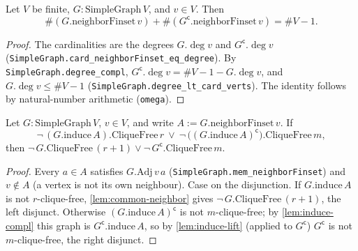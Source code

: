 \begin{lemma}
    \label{lem:degree-split}
    \leanok
    Let $V$ be finite, $G : \mathrm{SimpleGraph}\, V$, and $v \in V$. Then
    \[
        \#(G.\mathrm{neighborFinset}\, v) + \#(G^{\mathsf c}.\mathrm{neighborFinset}\, v)
        = \#V - 1 .
    \]
\end{lemma}
\begin{proof}
    The cardinalities are the degrees $G.\deg v$ and $G^{\mathsf c}.\deg v$
    (\texttt{SimpleGraph.card\_neighborFinset\_eq\_degree}). By
    \texttt{SimpleGraph.degree\_compl}, $G^{\mathsf c}.\deg v = \#V - 1 - G.\deg v$,
    and $G.\deg v \le \#V - 1$ (\texttt{SimpleGraph.degree\_lt\_card\_verts}).
    The identity follows by natural-number arithmetic (\texttt{omega}).
\end{proof}

\begin{lemma}
    \label{lem:neighbor-side}
    \leanok
    Let $G : \mathrm{SimpleGraph}\, V$, $v \in V$, and write
    $A := G.\mathrm{neighborFinset}\, v$. If
    \[
        \neg\,(G.\mathrm{induce}\, A).\mathrm{CliqueFree}\, r \ \lor\
        \neg\,\bigl((G.\mathrm{induce}\, A)^{\mathsf c}\bigr).\mathrm{CliqueFree}\, m ,
    \]
    then
    $\neg\, G.\mathrm{CliqueFree}\,(r{+}1) \lor \neg\, G^{\mathsf c}.\mathrm{CliqueFree}\, m$.
\end{lemma}
\begin{proof}
    Every $a \in A$ satisfies $G.\mathrm{Adj}\, v\, a$
    (\texttt{SimpleGraph.mem\_neighborFinset}) and $v \notin A$ (a vertex is not
    its own neighbour). Case on the disjunction. If $G.\mathrm{induce}\, A$ is not
    $r$-clique-free, \cref{lem:common-neighbor} gives
    $\neg\, G.\mathrm{CliqueFree}\,(r{+}1)$, the left disjunct. Otherwise
    $(G.\mathrm{induce}\, A)^{\mathsf c}$ is not $m$-clique-free; by
    \cref{lem:induce-compl} this graph is $G^{\mathsf c}.\mathrm{induce}\, A$, so by
    \cref{lem:induce-lift} (applied to $G^{\mathsf c}$) $G^{\mathsf c}$ is not
    $m$-clique-free, the right disjunct.
\end{proof}

